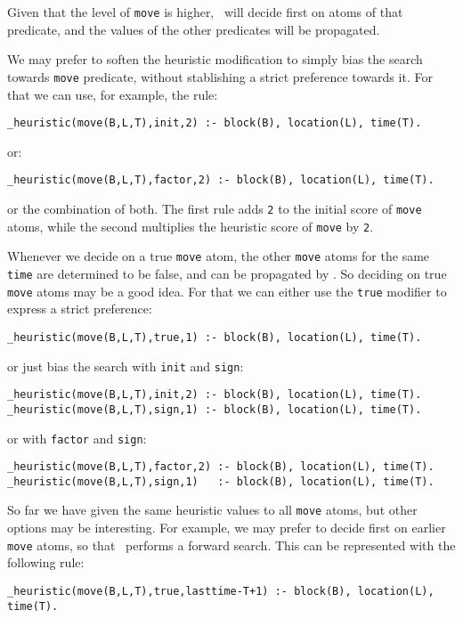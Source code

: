 Given that the level of \texttt{move} is higher,  \clasp\ will decide first on atoms of that predicate,
and the values of the other predicates will be propagated.

We may prefer to soften the heuristic modification to simply bias the search  towards \texttt{move} predicate,
without stablishing a strict preference towards it.  For that we can use, for example, the rule:
\begin{lstlisting}[numbers=none]
_heuristic(move(B,L,T),init,2) :- block(B), location(L), time(T).\end{lstlisting} or:
\begin{lstlisting}[numbers=none]
_heuristic(move(B,L,T),factor,2) :- block(B), location(L), time(T).\end{lstlisting}

or the combination of both.  The first rule adds \texttt{2} to the initial score of \texttt{move} atoms,
while the second multiplies the heuristic score of \texttt{move} by \texttt{2}.

Whenever we decide on a true \texttt{move} atom,  the other \texttt{move} atoms for the same \texttt{time} are determined to be false,
and can be propagated by \clasp. So deciding on true \texttt{move} atoms may be a good idea.
For that we can either use the \texttt{true} modifier to express a strict preference:
\begin{lstlisting}[numbers=none]
_heuristic(move(B,L,T),true,1) :- block(B), location(L), time(T).\end{lstlisting}

or just bias the search with \texttt{init} and \texttt{sign}:
\begin{lstlisting}[numbers=none]
_heuristic(move(B,L,T),init,2) :- block(B), location(L), time(T).
_heuristic(move(B,L,T),sign,1) :- block(B), location(L), time(T).\end{lstlisting}

or with \texttt{factor} and \texttt{sign}:
\begin{lstlisting}[numbers=none]
_heuristic(move(B,L,T),factor,2) :- block(B), location(L), time(T).
_heuristic(move(B,L,T),sign,1)   :- block(B), location(L), time(T).\end{lstlisting}



So far we have given the same heuristic values to all \texttt{move} atoms,
but other options may be interesting. For example, we may prefer to decide first on earlier \texttt{move} atoms,
so that \clasp\ performs a forward search. This can be represented with the following rule:
\begin{lstlisting}[numbers=none]
_heuristic(move(B,L,T),true,lasttime-T+1) :- block(B), location(L), time(T).\end{lstlisting}

